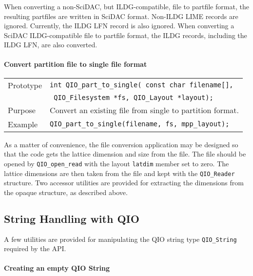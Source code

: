 \documentclass{article}
\newcommand{\QIOstring}{{\tt QIO\_String }}
\begin{document}
When converting a non-SciDAC, but ILDG-compatible, file to partfile
format, the resulting partfiles are written in SciDAC format.
Non-ILDG LIME records are ignored.  Currently, the ILDG LFN record is
also ignored.  When converting a SciDAC ILDG-compatible file to
partfile format, the ILDG records, including the ILDG LFN, are also
converted.

\paragraph{Convert partition file to single file format}

\begin{flushleft}
  \begin{tabular}{|l|l|}
  \hline
  Prototype      & \verb|int QIO_part_to_single( const char filename[], | \\
                 & \verb| QIO_Filesystem *fs, QIO_Layout *layout);| \\
  Purpose        & Convert an existing file from single to partition format. \\
\hline
  Example  & \verb|QIO_part_to_single(filename, fs, mpp_layout);|\\
   \hline
 \end{tabular}
\end{flushleft}
%

As a matter of convenience, the file conversion application may be
designed so that the code gets the lattice dimension and size from the
file.  The file should be opened by \verb|QIO_open_read| with the
layout \verb|latdim| member set to zero.  The lattice dimensions are
then taken from the file and kept with the \verb|QIO_Reader|
structure.  Two accessor utilities are provided for extracting the
dimensions from the opaque structure, as described above.


\subsection{String Handling with QIO}

 A few utilities are provided for manipulating the QIO string type
\QIOstring required by the API\@.

\paragraph{Creating an empty QIO String}
\end{document}
